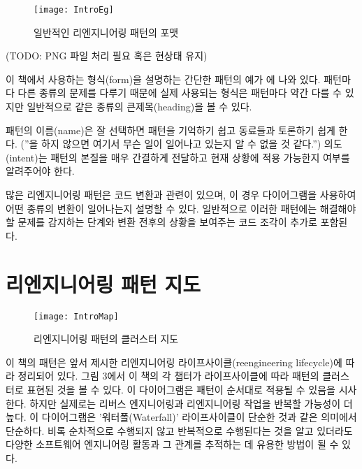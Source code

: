 \documentclass[a4paper,10pt,twoside]{book}
\begin{document}
\begin{figure}
\begin{center}
\texttt{[image: IntroEg]}
\caption{일반적인 리엔지니어링 패턴의 포맷}
\end{center}
\end{figure}
(TODO: PNG 파일 처리 필요 혹은 현상태 유지)

이 책에서 사용하는 형식(form)을 설명하는 간단한 패턴의 예가 에 나와 있다. 패턴마다 다른 종류의 문제를 다루기 때문에 실제 사용되는 형식은 패턴마다 약간 다를 수 있지만 일반적으로 같은 종류의 큰제목(heading)을 볼 수 있다.

패턴의 이름(name)은 잘 선택하면 패턴을 기억하기 쉽고 동료들과 토론하기 쉽게 한다. (''을 하지 않으면 여기서 무슨 일이 일어나고 있는지 알 수 없을 것 같다.'') 의도(intent)는 패턴의 본질을 매우 간결하게 전달하고 현재 상황에 적용 가능한지 여부를 알려주어야 한다. 

많은 리엔지니어링 패턴은 코드 변환과 관련이 있으며, 이 경우 다이어그램을 사용하여 어떤 종류의 변환이 일어나는지 설명할 수 있다. 일반적으로 이러한 패턴에는 해결해야 할 문제를 감지하는 단계와 변환 전후의 상황을 보여주는 코드 조각이 추가로 포함된다.

\section{리엔지니어링 패턴 지도}

\begin{figure}
\begin{center}
\texttt{[image: IntroMap]}
\caption{리엔지니어링 패턴의 클러스터 지도}
\end{center}
\end{figure}

이 책의 패턴은 앞서 제시한 리엔지니어링 라이프사이클(reengineering lifecycle)에 따라 정리되어 있다. 그림 3에서 이 책의 각 챕터가 라이프사이클에 따라 패턴의 클러스터로 표현된 것을 볼 수 있다. 이 다이어그램은 패턴이 순서대로 적용될 수 있음을 시사한다. 하지만 실제로는 리버스 엔지니어링과 리엔지니어링 작업을 반복할 가능성이 더 높다. 이 다이어그램은 '워터폴(Waterfall)' 라이프사이클이 단순한 것과 같은 의미에서 단순하다. 비록 순차적으로 수행되지 않고 반복적으로 수행된다는 것을 알고 있더라도 다양한 소프트웨어 엔지니어링 활동과 그 관계를 추적하는 데 유용한 방법이 될 수 있다.
\end{document}
